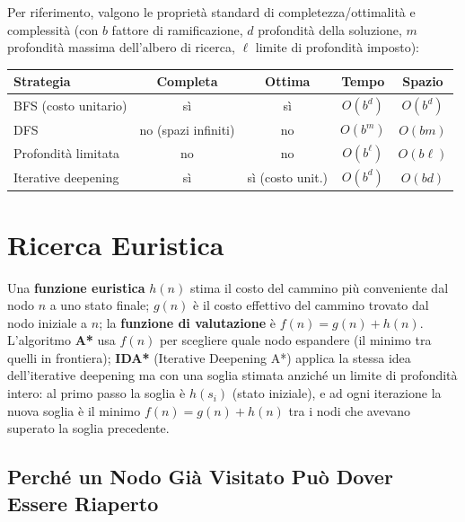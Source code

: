 \documentclass[a4paper,11pt]{article}
\begin{document}
Per riferimento, valgono le proprietà standard di completezza/ottimalità e complessità (con $b$ fattore di ramificazione, $d$ profondità della soluzione, $m$ profondità massima dell'albero di ricerca, $\ell$ limite di profondità imposto):

\begin{center}
\small
\begin{tabular}{lcccc}
\toprule
\textbf{Strategia} & \textbf{Completa} & \textbf{Ottima} & \textbf{Tempo} & \textbf{Spazio} \\
\midrule
BFS (costo unitario) & sì & sì & $O(b^d)$ & $O(b^d)$ \\
DFS & no (spazi infiniti) & no & $O(b^m)$ & $O(bm)$ \\
Profondità limitata & no & no & $O(b^\ell)$ & $O(b\ell)$ \\
Iterative deepening & sì & sì (costo unit.) & $O(b^d)$ & $O(bd)$ \\
\bottomrule
\end{tabular}
\end{center}

\newpage
\section{Ricerca Euristica}

Una \textbf{funzione euristica} $h(n)$ stima il costo del cammino più conveniente dal nodo $n$ a uno stato finale; $g(n)$ è il costo effettivo del cammino trovato dal nodo iniziale a $n$; la \textbf{funzione di valutazione} è $f(n)=g(n)+h(n)$. L'algoritmo \textbf{A*} usa $f(n)$ per scegliere quale nodo espandere (il minimo tra quelli in frontiera); \textbf{IDA*} (Iterative Deepening A*) applica la stessa idea dell'iterative deepening ma con una soglia stimata anziché un limite di profondità intero: al primo passo la soglia è $h(s_i)$ (stato iniziale), e ad ogni iterazione la nuova soglia è il minimo $f(n)=g(n)+h(n)$ tra i nodi che avevano superato la soglia precedente.

\subsection{Perché un Nodo Già Visitato Può Dover Essere Riaperto}
\end{document}
